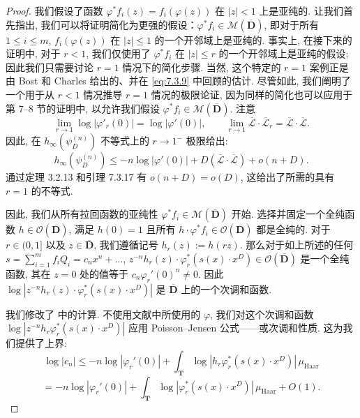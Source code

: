 \begin{proof}
我们假设了函数 \(\varphi^* f_i(z) = f_i(\varphi(z))\) 在 \(|z| < 1\) 上是亚纯的. 
让我们首先指出, 我们可以将证明简化为更强的假设：\(\varphi^* f_i \in \mathcal{M}(\overline{\mathbf{D}})\), 
即对于所有 \(1 \le i \le m\), \(f_i(\varphi(z))\) 在 \(|z| \le 1\) 的一个开邻域上是亚纯的. 
事实上, 在接下来的证明中, 对于 \(r < 1\), 
我们仅使用了 \(\varphi^* f_i\) 在 \(|z| \le r\) 的一个开邻域上是亚纯的假设; 
因此我们只需要讨论 \(r = 1\) 情况下的简化步骤. 
当然, 这个特定的 \(r = 1\) 案例正是由 Bost 和 Charles 给出的、并在 \eqref{eq:7.3.9} 中回顾的估计. 
尽管如此, 我们阐明了一个用于从 \(r < 1\) 情况推导 \(r = 1\) 情况的极限论证, 
因为同样的简化也可以应用于第 7--8 节的证明中, 
以允许我们假设 \(\varphi^* f_i \in \mathcal{M}(\overline{\mathbf{D}})\). 
注意
\[ \lim_{r \to 1} \log |\varphi'_r(0)| = \log |\varphi'(0)|, \qquad \lim_{r \to 1} \overline{\mathcal{L}} \cdot \overline{\mathcal{L}}_r = \overline{\mathcal{L}} \cdot \overline{\mathcal{L}}. \]
因此, 在 \(h_\infty(\psi_D^{(n)})\) 不等式上的 \(r \to 1^-\) 极限给出:
\[ h_{\infty}(\psi_D^{(n)}) \le -n \log |\varphi'(0)| + D(\overline{\mathcal{L}} \cdot \overline{\mathcal{L}}) + o(n+D). \]
通过定理 3.2.13 和引理 7.3.17 有 \(o(n+D)=o(D)\), 
这给出了所需的具有 \(r=1\) 的不等式.

因此, 我们从所有拉回函数的亚纯性 \(\varphi^* f_i \in \mathcal{M}(\overline{\mathbf{D}})\) 开始. 
选择并固定一个全纯函数 \(h \in \mathcal{O}(\overline{\mathbf{D}})\), 
满足 \(h(0) = 1\) 且所有 \(h \cdot \varphi^* f_i \in \mathcal{O}(\overline{\mathbf{D}})\) 都是全纯的. 
对于 \(r \in (0,1]\) 以及 \(z \in \overline{\mathbf{D}}\), 
我们遵循记号 \(h_r(z) := h(rz)\). 
那么对于如上所述的任何 \(s = \sum_{i=1}^m f_i Q_i = c_n x^n + \ldots\), 
\(z^{-n} h_r(z) \cdot \varphi_r^* (s(x) \cdot x^D) \in \mathcal{O}(\overline{\mathbf{D}})\) 
是一个全纯函数, 其在 \(z = 0\) 处的值等于 \(c_n \varphi_r'(0)^n \neq 0\). 
因此 \(\log |z^{-n} h_r(z) \cdot \varphi_r^* (s(x) \cdot x^D)|\) 是 \(\overline{\mathbf{D}}\) 上的一个次调和函数.

我们修改了 \cite[第 10.5.5 节]{Bos20} 中的计算. 
不使用文献中所使用的 \(\varphi\), 
我们对这个次调和函数 \(\log |z^{-n}h_r\varphi_r^*(s(x)\cdot x^D)|\) 应用 Poisson--Jensen 公式——或次调和性质. 
这为我们提供了上界:
\begin{equation}\label{eq:7.4.2}
\log |c_n| \le -n \log |\varphi_r'(0)| + \int_{\mathbf{T}} \log |h_r \varphi_r^*(s(x) \cdot x^D)| \, \mu_{\text{Haar}}
\end{equation}
\[ = -n \log |\varphi_r'(0)| + \int_{\mathbf{T}} \log |\varphi_r^*(s(x) \cdot x^D)| \, \mu_{\text{Haar}} + O(1). \]


\end{proof}
